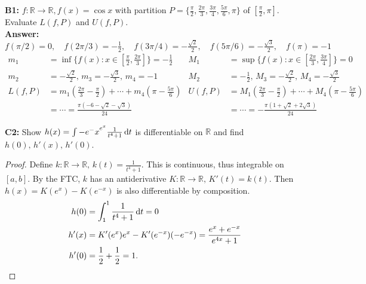 \documentclass{article}
\begin{document}
    \noindent \textbf{B1: }$f: \mathbb{R} \to \mathbb{R}, f(x)=\cos x$ with partition $P = \{\frac{\pi}{2},\frac{2\pi}{3},\frac{3\pi}{4},\frac{5\pi}{6},\pi\}$ of $[\frac{\pi}{2},\pi]$. Evaluate $L(f,P)$ and $U(f,P)$.\\
    \textbf{Answer: }$f(\pi/2)=0, \quad f(2\pi/3)=-\frac{1}{2}, \quad f(3\pi/4)=-\frac{\sqrt{2}}{2}, \quad f(5\pi/6)= -\frac{\sqrt{3}}{2}, \quad f(\pi)=-1$
    \begin{align*}
        m_1 &= \inf\{f(x) : x \in [\frac{\pi}{2}, \frac{2\pi}{3}]\} = -\frac{1}{2}  &   M_1 &= \sup\{f(x) : x \in [\frac{2\pi}{3}, \frac{3\pi}{4}]\} = 0\\
        m_2 &= -\frac{\sqrt{2}}{2}, \, m_3 = -\frac{\sqrt{3}}{2}, \, m_4 = -1    &   M_2 &= -\frac{1}{2}, \, M_3 = -\frac{\sqrt{2}}{2}, \, M_4 = -\frac{\sqrt{3}}{2}\\
        L(f,P) &= m_1(\frac{2\pi}{3}-\frac{\pi}{2})+\cdots+m_4(\pi-\frac{5\pi}{6})    &   U(f,P) &= M_1(\frac{2\pi}{3}-\frac{\pi}{2})+\cdots+M_4(\pi-\frac{5\pi}{6})\\
        &= \cdots = \frac{\pi(-6-\sqrt{2}-\sqrt{3})}{24} &   &= \cdots = -\frac{\pi(1+\sqrt{2}+2\sqrt{3})}{24}
    \end{align*}
        
    \noindent \textbf{C2: }Show $h(x) = \int-{e^-x}^{e^x} \frac{1}{t^4+1} \dif t$ is differentiable on $\mathbb{R}$ and find $h(0), \, h'(x), \,h'(0)$.
    \begin{proof}
        Define $k : \mathbb{R} \to \mathbb{R}, \, k(t) = \frac{1}{t^4+1}$. This is continuous, thus integrable on $[a,b]$. By the FTC, $k$ has an antiderivative $K: \mathbb{R} \to \mathbb{R}, \, K'(t) = k(t)$. Then $h(x) = K(e^x)-K(e^{-x})$ is also differentiable by composition.
        \begin{align*}
            h(0) &= \int_1^1 \frac{1}{t^4+1} \dif t = 0\\
            h'(x) &= K'(e^x)e^x-K'(e^{-x})(-e^{-x}) = \frac{e^x+e^{-x}}{e^{4x}+1}\\
            h'(0) &= \frac{1}{2}+\frac{1}{2} = 1.
        \end{align*}
        \end{proof}
        
\end{document}
